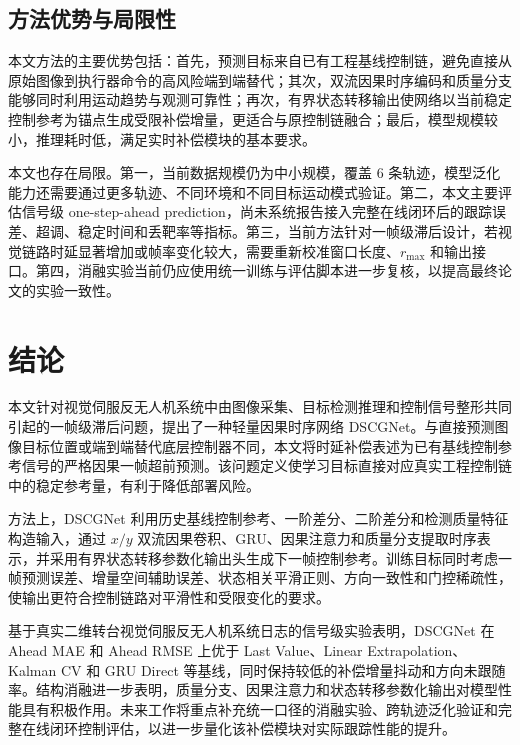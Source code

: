 \documentclass[journal]{IEEEtran}
\begin{document}
\subsection{方法优势与局限性}
本文方法的主要优势包括：首先，预测目标来自已有工程基线控制链，避免直接从原始图像到执行器命令的高风险端到端替代；其次，双流因果时序编码和质量分支能够同时利用运动趋势与观测可靠性；再次，有界状态转移输出使网络以当前稳定控制参考为锚点生成受限补偿增量，更适合与原控制链融合；最后，模型规模较小，推理耗时低，满足实时补偿模块的基本要求。

本文也存在局限。第一，当前数据规模仍为中小规模，覆盖 6 条轨迹，模型泛化能力还需要通过更多轨迹、不同环境和不同目标运动模式验证。第二，本文主要评估信号级 one-step-ahead prediction，尚未系统报告接入完整在线闭环后的跟踪误差、超调、稳定时间和丢靶率等指标。第三，当前方法针对一帧级滞后设计，若视觉链路时延显著增加或帧率变化较大，需要重新校准窗口长度、$r_{\max}$ 和输出接口。第四，消融实验当前仍应使用统一训练与评估脚本进一步复核，以提高最终论文的实验一致性。

\section{结论}
本文针对视觉伺服反无人机系统中由图像采集、目标检测推理和控制信号整形共同引起的一帧级滞后问题，提出了一种轻量因果时序网络 DSCGNet。与直接预测图像目标位置或端到端替代底层控制器不同，本文将时延补偿表述为已有基线控制参考信号的严格因果一帧超前预测。该问题定义使学习目标直接对应真实工程控制链中的稳定参考量，有利于降低部署风险。

方法上，DSCGNet 利用历史基线控制参考、一阶差分、二阶差分和检测质量特征构造输入，通过 $x/y$ 双流因果卷积、GRU、因果注意力和质量分支提取时序表示，并采用有界状态转移参数化输出头生成下一帧控制参考。训练目标同时考虑一帧预测误差、增量空间辅助误差、状态相关平滑正则、方向一致性和门控稀疏性，使输出更符合控制链路对平滑性和受限变化的要求。

基于真实二维转台视觉伺服反无人机系统日志的信号级实验表明，DSCGNet 在 Ahead MAE 和 Ahead RMSE 上优于 Last Value、Linear Extrapolation、Kalman CV 和 GRU Direct 等基线，同时保持较低的补偿增量抖动和方向未跟随率。结构消融进一步表明，质量分支、因果注意力和状态转移参数化输出对模型性能具有积极作用。未来工作将重点补充统一口径的消融实验、跨轨迹泛化验证和完整在线闭环控制评估，以进一步量化该补偿模块对实际跟踪性能的提升。
\end{document}
